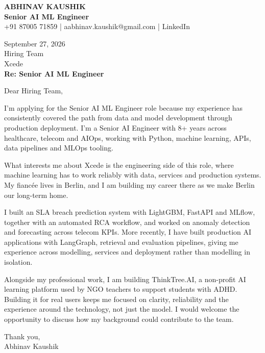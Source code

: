 \documentclass[10pt,a4paper]{article}
\begin{document}
\begin{center}
{\Large\bfseries ABHINAV KAUSHIK}\\[2pt]
{\bfseries Senior AI ML Engineer}\\[2pt]
+91 87005 71859 \quad | \quad aabhinav.kaushik@gmail.com \quad | \quad LinkedIn
\end{center}
\vspace{8pt}
September 27, 2026\\[6pt]
Hiring Team\\
Xcede\\[4pt]
\textbf{Re: Senior AI ML Engineer}

Dear Hiring Team,

I’m applying for the Senior AI ML Engineer role because my experience has consistently covered the path from data and model development through production deployment. I’m a Senior AI Engineer with 8+ years across healthcare, telecom and AIOps, working with Python, machine learning, APIs, data pipelines and MLOps tooling.

What interests me about Xcede is the engineering side of this role, where machine learning has to work reliably with data, services and production systems. My fiancée lives in Berlin, and I am building my career there as we make Berlin our long-term home.

I built an SLA breach prediction system with LightGBM, FastAPI and MLflow, together with an automated RCA workflow, and worked on anomaly detection and forecasting across telecom KPIs. More recently, I have built production AI applications with LangGraph, retrieval and evaluation pipelines, giving me experience across modelling, services and deployment rather than modelling in isolation.

Alongside my professional work, I am building ThinkTree.AI, a non-profit AI learning platform used by NGO teachers to support students with ADHD. Building it for real users keeps me focused on clarity, reliability and the experience around the technology, not just the model. I would welcome the opportunity to discuss how my background could contribute to the team.

Thank you,\\
Abhinav Kaushik
\end{document}
